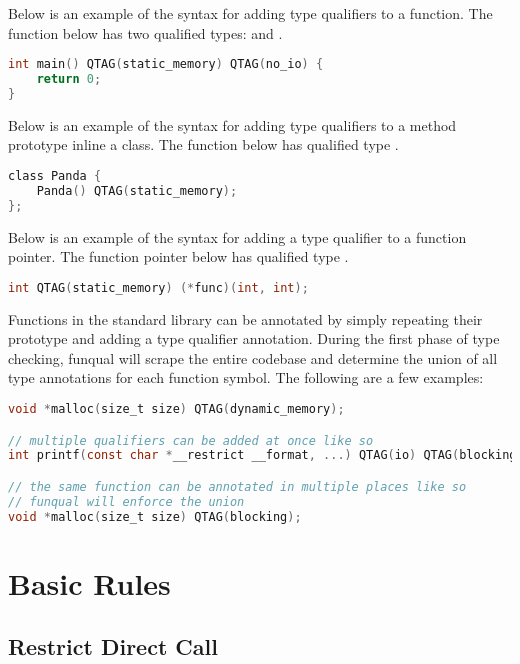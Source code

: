 Below is an example of the syntax for adding type qualifiers to a function.  The function below has two qualified types:  and .

\begin{lstlisting}[language=C]
int main() QTAG(static_memory) QTAG(no_io) {
    return 0;
}
\end{lstlisting}

Below is an example of the syntax for adding type qualifiers to a method prototype inline a class.  The function below has qualified type .

\begin{lstlisting}[language=C]
class Panda {
    Panda() QTAG(static_memory);
};
\end{lstlisting}

Below is an example of the syntax for adding a type qualifier to a function pointer.  The function pointer below has qualified type .

\begin{lstlisting}[language=C]
int QTAG(static_memory) (*func)(int, int);
\end{lstlisting}

Functions in the standard library can be annotated by simply repeating their prototype and adding a type qualifier annotation.  During the first phase of type checking, funqual will scrape the entire codebase and determine the union of all type annotations for each function symbol.  The following are a few examples:

\begin{lstlisting}[language=C]
void *malloc(size_t size) QTAG(dynamic_memory);

// multiple qualifiers can be added at once like so
int printf(const char *__restrict __format, ...) QTAG(io) QTAG(blocking);

// the same function can be annotated in multiple places like so 
// funqual will enforce the union
void *malloc(size_t size) QTAG(blocking);
\end{lstlisting}

\section{Basic Rules}

\subsection{Restrict Direct Call}

